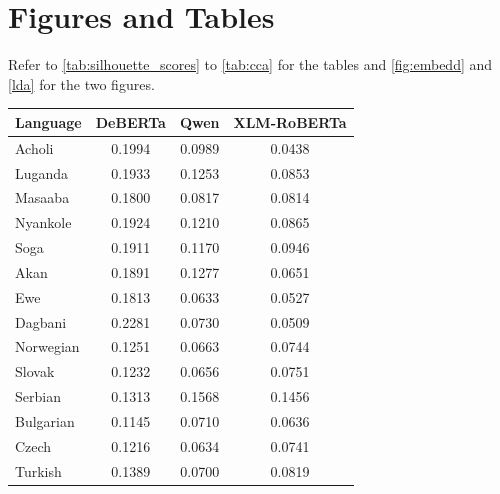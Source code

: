 \documentclass[11pt]{article} %
\begin{document}
    \section{Figures and Tables}
    \label{app:fig_tables} Refer to \autoref{tab:silhouette_scores} to
    \ref{tab:cca} for the tables and \autoref{fig:embedd} and \ref{lda} for the
    two figures.
    \begin{table}[htbp]
        \centering
        \vspace{0.5em}
        \small
        \begin{tabular}{lccc}
            \toprule \textbf{Language} & \textbf{DeBERTa} & \textbf{Qwen} & \textbf{XLM-RoBERTa} \\
            \midrule Acholi            & 0.1994           & 0.0989        & 0.0438               \\
            Luganda                    & 0.1933           & 0.1253        & 0.0853               \\
            Masaaba                    & 0.1800           & 0.0817        & 0.0814               \\
            Nyankole                   & 0.1924           & 0.1210        & 0.0865               \\
            Soga                       & 0.1911           & 0.1170        & 0.0946               \\
            Akan                       & 0.1891           & 0.1277        & 0.0651               \\
            Ewe                        & 0.1813           & 0.0633        & 0.0527               \\
            Dagbani                    & 0.2281           & 0.0730        & 0.0509               \\
            Norwegian                  & 0.1251           & 0.0663        & 0.0744               \\
            Slovak                     & 0.1232           & 0.0656        & 0.0751               \\
            Serbian                    & 0.1313           & 0.1568        & 0.1456               \\
            Bulgarian                  & 0.1145           & 0.0710        & 0.0636               \\
            Czech                      & 0.1216           & 0.0634        & 0.0741               \\
            Turkish                    & 0.1389           & 0.0700        & 0.0819               \\

\end{tabular}
\end{table}
\end{document}
